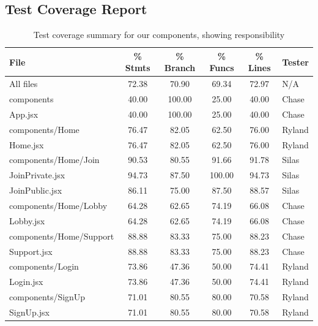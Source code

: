 \subsection{Test Coverage Report}

\begin{table}[H]
\centering
\begin{tabular}{|l|c|c|c|c|l|}
\hline
\textbf{File} & \textbf{\% Stmts} & \textbf{\% Branch} & \textbf{\% Funcs} & \textbf{\% Lines} & \textbf{Tester} \\ \hline
All files                & 72.38  & 70.90  & 69.34  & 72.97  & N/A \\ \hline
components               & 40.00  & 100.00 & 25.00  & 40.00  & Chase \\ \hline
\hspace{1em}App.jsx      & 40.00  & 100.00 & 25.00  & 40.00  & Chase \\ \hline
components/Home          & 76.47  & 82.05  & 62.50  & 76.00  & Ryland \\ \hline
\hspace{1em}Home.jsx     & 76.47  & 82.05  & 62.50  & 76.00  & Ryland \\ \hline
components/Home/Join     & 90.53  & 80.55  & 91.66  & 91.78  & Silas \\ \hline
\hspace{1em}JoinPrivate.jsx & 94.73  & 87.50  & 100.00  & 94.73 & Silas \\ \hline
\hspace{1em}JoinPublic.jsx  & 86.11  & 75.00  & 87.50  & 88.57 & Silas \\ \hline
components/Home/Lobby    & 64.28  & 62.65  & 74.19  & 66.08  & Chase \\ \hline
\hspace{1em}Lobby.jsx    & 64.28  & 62.65  & 74.19  & 66.08  & Chase \\ \hline
components/Home/Support  & 88.88  & 83.33  & 75.00  & 88.23  & Chase \\ \hline
\hspace{1em}Support.jsx  & 88.88  & 83.33  & 75.00  & 88.23  & Chase \\ \hline
components/Login         & 73.86  & 47.36  & 50.00  & 74.41  & Ryland \\ \hline
\hspace{1em}Login.jsx    & 73.86  & 47.36  & 50.00  & 74.41  & Ryland \\ \hline
components/SignUp        & 71.01  & 80.55  & 80.00  & 70.58  & Ryland \\ \hline
\hspace{1em}SignUp.jsx   & 71.01  & 80.55  & 80.00  & 70.58  & Ryland \\ \hline
\end{tabular}
\caption{Test coverage summary for our components, showing responsibility}
\label{table:test-coverage-responsibility}
\end{table}

